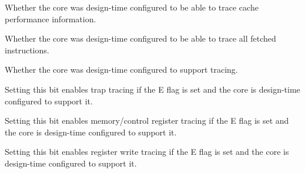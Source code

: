 \reset{*}
Whether the core was design-time configured to be able to trace cache
performance information.

\implementation{}

\reset{*}
Whether the core was design-time configured to be able to trace all fetched
instructions.

\implementation{}

\reset{*}
Whether the core was design-time configured to support tracing.

\implementation{}

Setting this bit enables trap tracing if the E flag is set and the core is 
design-time configured to support it.

\implementation{}

Setting this bit enables memory/control register tracing if the E flag is set 
and the core is design-time configured to support it.

\implementation{}

Setting this bit enables register write tracing if the E flag is set and the 
core is design-time configured to support it.

